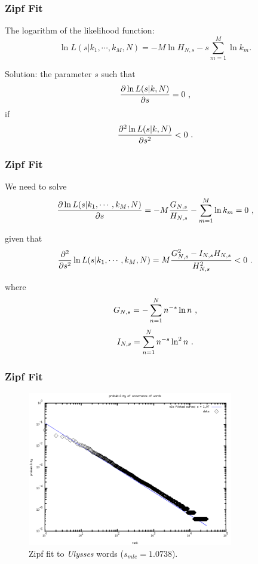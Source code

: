 \documentclass{beamer}
\begin{document}
\frame
{
  \frametitle{Zipf Fit}
  The logarithm of the likelihood function:
  \begin{equation}
  \ln L(s|k_1,\cdots,k_M,N) = -M \ln H_{N,s} - s \sum_{m=1}^{M} \ln k_m .
  \end{equation}

  Solution:
  the parameter $s$ such that
  \begin{equation}
  \label{eq:dervloglikelihood}
  \frac{\partial \ln L(s|k,N)}{\partial s} = 0  \textmd{ ,}
  \end{equation}
  if
  \begin{equation}
  \frac{\partial^2 \ln L(s|k,N)}{\partial s^2} < 0 \textmd{ .}
  \end{equation}
}


\frame
{
  \frametitle{Zipf Fit}
  We need to solve
  \begin{equation}
  \frac{\partial \ln L(s|k_1,\cdots,k_M,N)}{\partial s}  = -M \frac{G_{N,s}}{H_{N,s}} - \sum_{m=1}^{M} \ln k_m  = 0 \textmd{ ,}
  \end{equation}

  given that
  \begin{equation}
  \frac{\partial^2}{\partial s^2} \ln L(s|k_1,\cdots,k_M,N) = M \frac{  G_{N,s}^2 - I_{N,s} H_{N,s}  } {H_{N,s}^2} < 0 \textmd{ .}
  \end{equation}

  where
  \begin{equation}
  G_{N,s} = - \sum_{n=1}^{N} n^{-s} \ln n  \textmd{ ,}
  \end{equation}
  \begin{equation}
  I_{N,s} = \sum_{n=1}^{N} n^{-s} \ln^2 n \textmd{ .}
  \end{equation}
}



\frame
{
  \frametitle{Zipf Fit}
  \vspace{-0.3cm}
  \begin{figure}[h]
  \centering
  \includegraphics[width=0.8\textwidth]{imagespresentation/ulysses_fittedcurve_words_probabilities300a.png}
  \caption{Zipf fit to \emph{Ulysses} words ($s_{mle}=1.0738$).}
  \end{figure}
}
\end{document}
